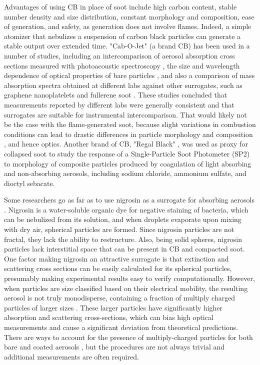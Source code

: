 Advantages of using CB in place of soot include high carbon content, stable number density and size distribution, constant morphology and composition, ease of generation, and safety, as generation does not involve flames. Indeed, a simple atomizer that nebulizes a suspension of carbon black particles can generate a stable output over extended time. "Cab-O-Jet" (a brand CB) has been used in a number of studies, including an intercomparison of aerosol absorption cross sections measured with photoacoustic spectroscopy \citep{RN3}, the size and wavelength dependence of optical properties of bare particles \citep{RN4}, and also a comparison of mass absorption spectra obtained at different labs against other surrogates, such as graphene nanoplatelets and fullerene soot \citep{RN63}. These studies concluded that measurements reported by different labs were generally consistent and that surrogates are suitable for instrumental intercomparison. That would likely not be the case with the flame-generated soot, because slight variations in combustion conditions can lead to drastic differences in particle morphology and composition \citep{moore2014mapping}, and hence optics. Another brand of CB, "Regal Black" \citep{RN65}, was used as proxy for collapsed soot to study the response of a Single-Particle Soot Photometer (SP2) to morphology of composite particles produced by coagulation of light absorbing and non-absorbing aerosols, including sodium chloride, ammonium sulfate, and dioctyl sebacate.

Some researchers go as far as to use nigrosin as a surrogate for absorbing aerosols \citep{RN8,RN54,RN55,RN56,RN57,drinovec2022dual}. Nigrosin is a water-soluble organic dye for negative staining of bacteria, which can be nebulized from its solution, and when droplets evaporate upon mixing with dry air, spherical particles are formed. Since nigrosin particles are not fractal, they lack the ability to restructure. Also, being solid spheres, nigrosin particles lack interstitial space that can be present in CB and compacted soot. One factor making nigrosin an attractive surrogate is that extinction and scattering cross sections can be easily calculated for its spherical particles, presumably making experimental results easy to verify computationally. However, when particles are size classified based on their electrical mobility, the resulting aerosol is not truly monodisperse, containing a fraction of multiply charged particles of larger sizes \citep{mcmurry2002relationship,pagels2009processing}. These larger particles have significantly higher absorption and scattering cross-sections, which can bias high optical measurements \citep{RN50} and cause a significant deviation from theoretical predictions. There are ways to account for the presence of multiply-charged particles for both bare and coated aerosols \citep{RN67, RN77}, but the procedures are not always trivial and additional measurements are often required.

